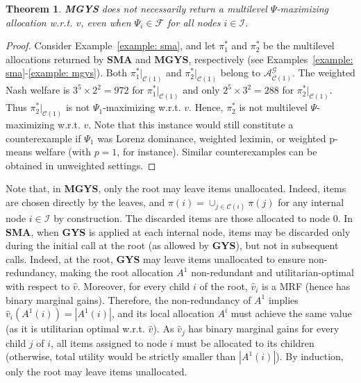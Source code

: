 \documentclass[]{article}
\newtheorem{theorem}{Theorem}
\newcommand{\items}{\mathcal{G}}
\newcommand{\children}{\mathcal{C}}
\newcommand{\internal}{\mathcal{I}}
\newcommand{\fair}{\mathcal{F}}
\newcommand{\allocations}{\mathcal{A}}
\begin{document}
\begin{theorem}
    {\bf MGYS} does not necessarily return a multilevel $\Psi$-maximizing allocation w.r.t. $v$, even when $\Psi_i \in \fair$ for all nodes $i \in \internal$.\color{black}
\end{theorem}

\begin{proof} 
Consider Example~\ref{example: sma}, and let $\pi^*_1$ and $\pi^*_2$ be the multilevel allocations returned by \textbf{SMA} and \textbf{MGYS}, respectively (see Examples~\ref{example: sma}-\ref{example: mgys}). Both $\pi^*_1 \vert_{\children(1)}$ and $\pi^*_2 \vert_{\children(1)}$ belong to $\allocations^\items_{\children(1)}$. The weighted Nash welfare is $3^5  \times  2^2  =  972$ for $\pi^*_1 \vert_{\children(1)}$ and only $2^5 \times  3^2  =  288$ for $\pi^*_2 \vert_{\children(1)}$. Thus $\pi^*_2 \vert_{\children(1)}$ is not $\Psi_1$-maximizing w.r.t. $v$. Hence, $\pi^*_2$ is not multilevel $\Psi$-maximizing w.r.t. $v$.
Note that this instance would still constitute a counterexample if $\Psi_1$ was Lorenz dominance, weighted leximin, or weighted p-means welfare (with $p=1$, for instance). 
Similar counterexamples can be obtained in unweighted settings.
\end{proof}

Note that, in \textbf{MGYS}, only the root may leave  items unallocated. Indeed, items are chosen directly by the leaves, and $\pi(i) = \cup_{j \in \children(i)} \pi(j)$ for any internal node $i \in \internal$ by construction. The discarded items are those allocated to node $0$. In {\bf SMA}, when {\bf GYS} is applied at each internal node, items may be discarded only during the initial call at the root (as allowed by {\bf GYS}), but not in subsequent calls. Indeed, at the root, {\bf GYS} may leave items unallocated to ensure non-redundancy, making the root allocation $A^{1}$ non-redundant and utilitarian-optimal with respect to $\hat{v}$. Moreover, for every child $i$ of the root, $\hat{v}_i$ is a MRF (hence has binary marginal gains). Therefore, the non-redundancy of $A^{1}$ implies $\hat{v}_i(A^{1}(i))=|A^{1}(i)|$, and its local allocation $A^i$ must achieve the same value (as it is utilitarian optimal w.r.t. $\hat{v}$).  
As $\hat{v}_j$ has binary marginal gains for every child $j$ of $i$, all items assigned to node $i$ must be allocated to its children (otherwise, total utility would be strictly smaller than $|A^{1}(i)|$). By induction, only the root may leave items unallocated.  

\medskip
\end{document}
